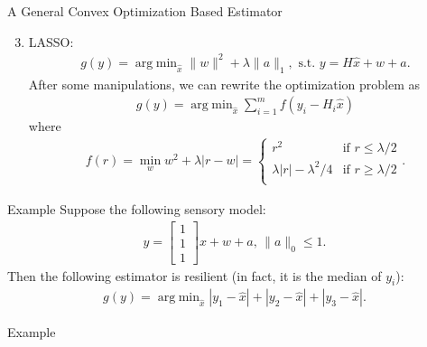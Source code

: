 \documentclass[10pt]{beamer}
\DeclareMathOperator{\argmin}{arg\;min}
\begin{document}
\begin{frame}{A General Convex Optimization Based Estimator}
  \begin{enumerate}  \setcounter{enumi}{2}
  \item LASSO:
    \begin{align*}
      g(y) = \argmin_{\hat x} \|w\|^2+\lambda \|a\|_1, \text{ s.t. }y=H\hat x+w+a.
    \end{align*}
    After some manipulations, we can rewrite the optimization problem as
    \begin{align*}
      g(y) = \argmin_{\hat x} \sum_{i=1}^m f(y_i-H_i\hat x)
    \end{align*}
    where
    \begin{align*}
      f(r) = \min_{w} w^2 + \lambda |r-w| = \begin{cases}
        r^2 & \text{if } r \leq \lambda/2\\
        \lambda |r|-\lambda^2/4 & \text{if } r\geq \lambda/2\\
      \end{cases}.
    \end{align*}
  \end{enumerate}
\end{frame}

\begin{frame}{Example}
  Suppose the following sensory model:
  \begin{align*}
    y = \begin{bmatrix}
      1\\
      1\\
      1
    \end{bmatrix}x + w+a,\,\|a\|_0\leq 1.
  \end{align*}
  Then the following estimator is resilient (in fact, it is the median of $y_i$):
  \begin{align*}
    g(y) = \argmin_{\hat x}  |y_1-\hat x|+|y_2-\hat x|+|y_3-\hat x|.
  \end{align*}
\end{frame}

\begin{frame}{Example}
  \begin{figure}[ht]
    \centering
  \end{figure}
  \color{white}{If we interpret the function $|y_i-\hat x|$ as a potential function generate by sensor $i$, then we can see that sensor $i$ is dragging $\hat x$ towards $y_i$ with $1$ unit of force. The equilibrium point will be at the middle $y_i$.}
\end{frame}
\end{document}
